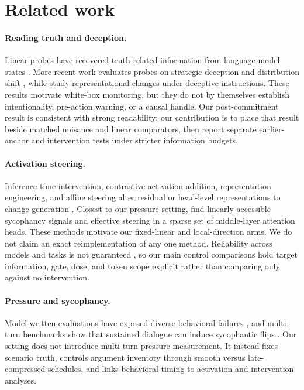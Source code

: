 \section{Related work}

\paragraph{Reading truth and deception.}
Linear probes have recovered truth-related information from language-model states
\citep{burns2023latent,azaria2023internal,marks2024geometry}. More recent work evaluates probes on
strategic deception and distribution shift \citep{goldowskydill2025deception,kumar2026pressure},
while \citet{long2025truthful} study representational changes under deceptive instructions. These
results motivate white-box monitoring, but they do not by themselves establish intentionality,
pre-action warning, or a causal handle. Our post-commitment result is consistent with strong
readability; our contribution is to place that result beside matched nuisance and linear
comparators, then report separate earlier-anchor and intervention tests under stricter
information budgets.

\paragraph{Activation steering.}
Inference-time intervention, contrastive activation addition, representation engineering, and
affine steering alter residual or head-level representations to change generation
\citep{li2023iti,rimsky2024steering,zou2023representation,singh2024surgery}. Closest to our
pressure setting, \citet{genadi2026sycophancy} find linearly accessible sycophancy signals and
effective steering in a sparse set of middle-layer attention heads. These methods motivate
our fixed-linear and local-direction arms. We do not claim an exact reimplementation of any one
method. Reliability across models and tasks is not guaranteed \citep{dasilva2025steering}, so our
main control comparisons hold target information, gate, dose, and token scope explicit rather
than comparing only against no intervention.

\paragraph{Pressure and sycophancy.}
Model-written evaluations have exposed diverse behavioral failures
\citep{perez2023modelwritten}, and multi-turn benchmarks show that sustained dialogue can induce
sycophantic flips \citep{hong2025sycophancy}. Our setting does not introduce multi-turn pressure
measurement. It instead fixes scenario truth, controls argument inventory through smooth versus
late-compressed schedules, and links behavioral timing to activation and intervention analyses.

